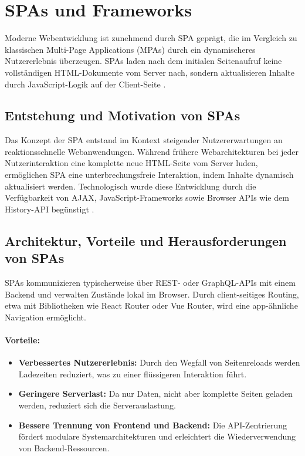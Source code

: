 \section{\aclp{SPA} und Frameworks}
\label{sec:spa-frameworks}

Moderne Webentwicklung ist zunehmend durch \ac{SPA} geprägt, die im Vergleich zu klassischen Multi-Page Applications (MPAs) durch ein dynamischeres Nutzererlebnis überzeugen. \acp{SPA} laden nach dem initialen Seitenaufruf keine vollständigen HTML-Dokumente vom Server nach, sondern aktualisieren Inhalte durch JavaScript-Logik auf der Client-Seite \cite{Basumallick2022}.

\subsection{Entstehung und Motivation von \acp{SPA}}
Das Konzept der SPA entstand im Kontext steigender Nutzererwartungen an reaktionsschnelle Webanwendungen. Während frühere Webarchitekturen bei jeder Nutzerinteraktion eine komplette neue HTML-Seite vom Server luden, ermöglichen \acs{SPA} eine unterbrechungsfreie Interaktion, indem Inhalte dynamisch aktualisiert werden. Technologisch wurde diese Entwicklung durch die Verfügbarkeit von AJAX, JavaScript-Frameworks sowie Browser APIs wie dem History-API begünstigt \cite{Basumallick2022}.

\subsection{Architektur, Vorteile und Herausforderungen von \acp{SPA}}
\acp{SPA} kommunizieren typischerweise über \ac{REST}- oder GraphQL-APIs mit einem Backend und verwalten Zustände lokal im Browser. Durch client-seitiges Routing, etwa mit Bibliotheken wie React Router oder Vue Router, wird eine app-ähnliche Navigation ermöglicht.

\paragraph{Vorteile:}
\begin{itemize}
	\item \textbf{Verbessertes Nutzererlebnis:} Durch den Wegfall von Seitenreloads werden Ladezeiten reduziert, was zu einer flüssigeren Interaktion führt.
	\item \textbf{Geringere Serverlast:} Da nur Daten, nicht aber komplette Seiten geladen werden, reduziert sich die Serverauslastung.
	\item \textbf{Bessere Trennung von Frontend und Backend:} Die API-Zentrierung fördert modulare Systemarchitekturen und erleichtert die Wiederverwendung von Backend-Ressourcen.
\end{itemize}

